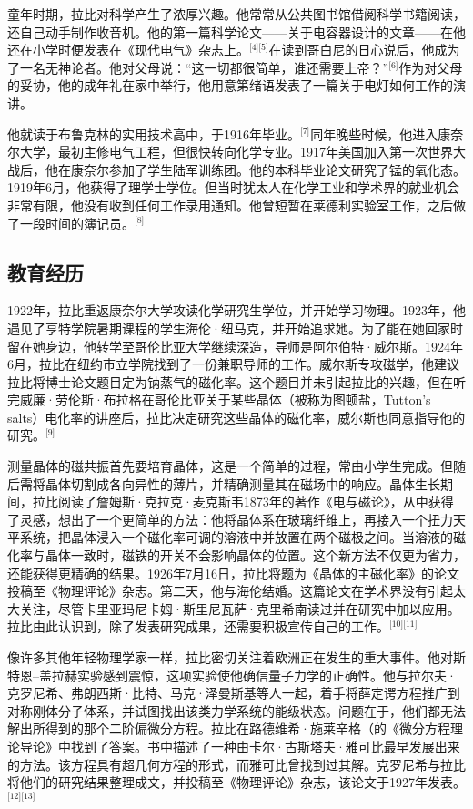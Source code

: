 童年时期，拉比对科学产生了浓厚兴趣。他常常从公共图书馆借阅科学书籍阅读，还自己动手制作收音机。他的第一篇科学论文——关于电容器设计的文章——在他还在小学时便发表在《现代电气》杂志上。\(^\text{[4][5]}\)在读到哥白尼的日心说后，他成为了一名无神论者。他对父母说：“这一切都很简单，谁还需要上帝？”\(^\text{[6]}\)作为对父母的妥协，他的成年礼在家中举行，他用意第绪语发表了一篇关于电灯如何工作的演讲。

他就读于布鲁克林的实用技术高中，于1916年毕业。\(^\text{[7]}\)同年晚些时候，他进入康奈尔大学，最初主修电气工程，但很快转向化学专业。1917年美国加入第一次世界大战后，他在康奈尔参加了学生陆军训练团。他的本科毕业论文研究了锰的氧化态。1919年6月，他获得了理学士学位。但当时犹太人在化学工业和学术界的就业机会非常有限，他没有收到任何工作录用通知。他曾短暂在莱德利实验室工作，之后做了一段时间的簿记员。\(^\text{[8]}\)
\subsection{教育经历}
1922年，拉比重返康奈尔大学攻读化学研究生学位，并开始学习物理。1923年，他遇见了亨特学院暑期课程的学生海伦·纽马克，并开始追求她。为了能在她回家时留在她身边，他转学至哥伦比亚大学继续深造，导师是阿尔伯特·威尔斯。1924年6月，拉比在纽约市立学院找到了一份兼职导师的工作。威尔斯专攻磁学，他建议拉比将博士论文题目定为钠蒸气的磁化率。这个题目并未引起拉比的兴趣，但在听完威廉·劳伦斯·布拉格在哥伦比亚关于某些晶体（被称为图顿盐，Tutton's salts）电化率的讲座后，拉比决定研究这些晶体的磁化率，威尔斯也同意指导他的研究。\(^\text{[9]}\)

测量晶体的磁共振首先要培育晶体，这是一个简单的过程，常由小学生完成。但随后需将晶体切割成各向异性的薄片，并精确测量其在磁场中的响应。晶体生长期间，拉比阅读了詹姆斯·克拉克·麦克斯韦1873年的著作《电与磁论》，从中获得了灵感，想出了一个更简单的方法：他将晶体系在玻璃纤维上，再接入一个扭力天平系统，把晶体浸入一个磁化率可调的溶液中并放置在两个磁极之间。当溶液的磁化率与晶体一致时，磁铁的开关不会影响晶体的位置。这个新方法不仅更为省力，还能获得更精确的结果。1926年7月16日，拉比将题为《晶体的主磁化率》的论文投稿至《物理评论》杂志。第二天，他与海伦结婚。这篇论文在学术界没有引起太大关注，尽管卡里亚玛尼卡姆·斯里尼瓦萨·克里希南读过并在研究中加以应用。拉比由此认识到，除了发表研究成果，还需要积极宣传自己的工作。\(^\text{[10][11]}\)

像许多其他年轻物理学家一样，拉比密切关注着欧洲正在发生的重大事件。他对斯特恩–盖拉赫实验感到震惊，这项实验使他确信量子力学的正确性。他与拉尔夫·克罗尼希、弗朗西斯·比特、马克·泽曼斯基等人一起，着手将薛定谔方程推广到对称刚体分子体系，并试图找出该类力学系统的能级状态。问题在于，他们都无法解出所得到的那个二阶偏微分方程。拉比在路德维希·施莱辛格（的《微分方程理论导论》中找到了答案。书中描述了一种由卡尔·古斯塔夫·雅可比最早发展出来的方法。该方程具有超几何方程的形式，而雅可比曾找到过其解。克罗尼希与拉比将他们的研究结果整理成文，并投稿至《物理评论》杂志，该论文于1927年发表。\(^\text{[12][13]}\)
